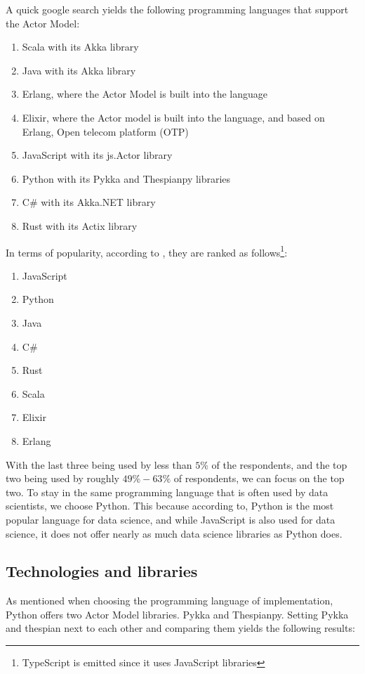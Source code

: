 \documentclass[a4paper]{article}
\begin{document}
A quick google search yields the following programming languages that support the Actor Model:
\begin{enumerate}
    \item Scala with its Akka library
    \item Java with its Akka library
    \item Erlang, where the Actor Model is built into the language
    \item Elixir, where the Actor model is built into the language, and based on Erlang, Open telecom platform (OTP)
    \item JavaScript with its js.Actor library
    \item Python with its Pykka and Thespianpy libraries
    \item C\# with its Akka.NET library
    \item Rust with its Actix library
\end{enumerate}

In terms of popularity, according to \cite{stackoverflowsurvey}, they are ranked as follows\footnote{TypeScript is emitted since it uses JavaScript libraries}:
\begin{enumerate}
    \item JavaScript
    \item Python
    \item Java
    \item C\#
    \item Rust
    \item Scala
    \item Elixir
    \item Erlang
\end{enumerate}
With the last three being used by less than \(5\%\) of the respondents, and the top two being used by roughly \(49\%-63\%\) of respondents, we can focus on the top two. To stay in the same programming language that is often used by data scientists, we choose Python. This because according to, Python is the most popular language for data science, and while JavaScript is also used for data science, it does not offer nearly as much data science libraries as Python does.
\subsection{Technologies and libraries}
As mentioned when choosing the programming language of implementation, Python offers two Actor Model libraries. Pykka and Thespianpy. Setting Pykka and thespian next to each other and comparing them yields the following results:
\end{document}
